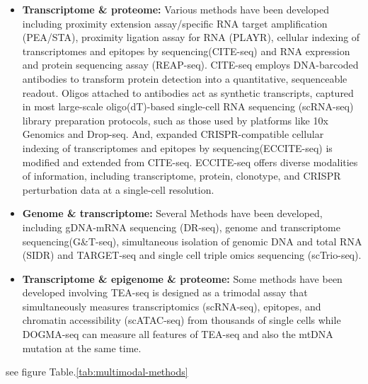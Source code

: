 \begin{itemize}
	\item \textbf{Transcriptome \& proteome:}
	Various methods have been developed including proximity extension assay/specific RNA target amplification (PEA/STA), proximity ligation assay for RNA (PLAYR), cellular indexing of transcriptomes and epitopes by sequencing(CITE-seq)\citep{stoeckius2017citeseq} and RNA expression and protein sequencing assay (REAP-seq)\citep{peterson2017reapseq}. CITE-seq employs DNA-barcoded antibodies to transform protein detection into a quantitative, sequenceable readout. Oligos attached to antibodies act as synthetic transcripts, captured in most large-scale oligo(dT)-based single-cell RNA sequencing (scRNA-seq) library preparation protocols, such as those used by platforms like 10x Genomics and Drop-seq. And, expanded CRISPR-compatible cellular indexing of transcriptomes and epitopes by sequencing(ECCITE-seq)\citep{mimitou2019ECCITE} is modified and extended from CITE-seq. ECCITE-seq offers diverse modalities of information, including transcriptome, protein, clonotype, and CRISPR perturbation data at a single-cell resolution. 

	\item \textbf{Genome \& transcriptome:}
	Several Methods have been developed, including gDNA-mRNA sequencing (DR-seq)\citep{dey2015drseq}, genome and transcriptome sequencing(G\&T-seq)\citep{macaulay2015gttseq}, simultaneous isolation of genomic DNA and total RNA (SIDR)\citep{han2018sidr} and TARGET-seq\citep{rodriguez2019targetseq} and single cell triple omics sequencing (scTrio-seq)\citep{hou2016sctrioseq}. 

	\item \textbf{Transcriptome \& epigenome \& proteome:}
	Some methods have been developed involving TEA-seq\citep{swanson2021simultaneous} is designed as a trimodal assay that simultaneously measures transcriptomics (scRNA-seq), epitopes, and chromatin accessibility (scATAC-seq) from thousands of single cells while DOGMA-seq\citep{mimitou2021scalable} can measure all features of TEA-seq and also the mtDNA mutation at the same time.
\end{itemize}





see figure Table.\ref{tab:multimodal-methods}

